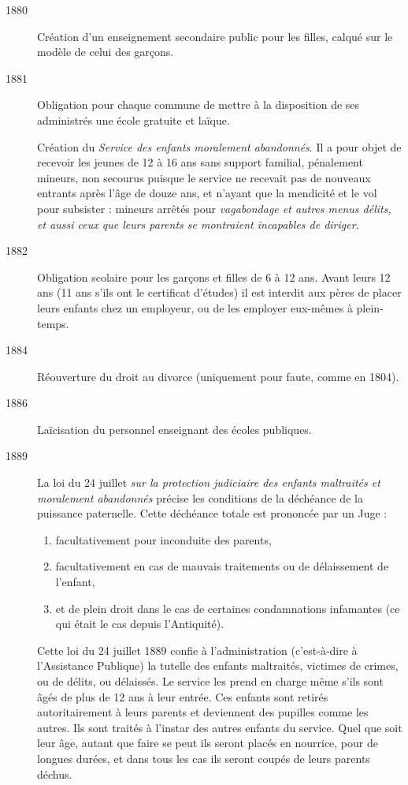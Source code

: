 \begin{description}
\item[1880] Création d'un enseignement secondaire public pour les filles, calqué sur le modèle de celui des garçons. 

\item[1881] Obligation pour chaque commune de mettre à la disposition de ses administrés une école gratuite et laïque.

Création du \emph{Service des enfants moralement abandonnés}. Il a pour objet de recevoir les jeunes de 12 à 16 ans sans support familial, pénalement mineurs, non secourus puisque le service ne recevait pas de nouveaux entrants après l'âge de douze ans, et n'ayant que la mendicité et le vol pour subsister : mineurs arrêtés pour {\emph{vagabondage et autres menus délits, et aussi ceux que leurs parents se montraient incapables de diriger}}.

\item[1882] Obligation scolaire pour les garçons et filles de 6 à 12 ans. Avant leurs 12 ans (11 ans s'ils ont le certificat d'études) il est interdit aux pères de placer leurs enfants chez un employeur, ou de les employer eux-mêmes à plein-temps.

\item[1884] Réouverture du droit au divorce (uniquement pour faute, comme en 1804).

\item[1886] Laïcisation du personnel enseignant des écoles publiques. 

\item[1889] La loi du 24 juillet {\emph{sur la protection judiciaire des enfants maltraités et moralement abandonnés}} précise les conditions de la déchéance de la puissance paternelle. Cette déchéance totale est prononcée par un Juge :
\begin{enumerate}[leftmargin=*,itemsep=0pt]
\item facultativement pour inconduite des parents,
\item facultativement en cas de mauvais traitements ou de délaissement de l'enfant,
\item et de plein droit dans le cas de certaines condamnations infamantes (ce qui était le cas depuis l'Antiquité).
\end{enumerate}

Cette loi du 24 juillet 1889 %
confie à l'administration (c'est-à-dire à l'Assistance Publique) la tutelle des enfants maltraités, victimes de crimes, ou de délits, ou délaissés. Le service les prend en charge même s'ils sont âgés de plus de 12 ans à leur entrée. Ces enfants sont retirés autoritairement à leurs parents et deviennent des pupilles comme les autres. Ils sont traités à l'instar des autres enfants du service. Quel que soit leur âge, autant que faire se peut ils seront placés en nourrice, pour de longues durées, et dans tous les cas ils seront coupés de leurs parents déchus.


\end{description}
